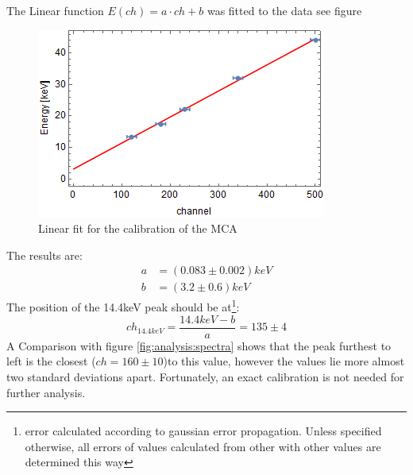The Linear function $E(ch)=a\cdot ch+b$ was fitted to the data see figure
\begin{figure}[H]
\centering
\includegraphics[width=0.7\linewidth]{../results/calibration/fit}
\caption[MCA calibration]{Linear fit for the calibration of the MCA}
\label{fig:calibrationfit}
\end{figure}
The results are:
\begin{equation}
\begin{aligned}
	a &= (0.083\pm0.002)keV\\
	b &= (3.2 \pm 0.6)keV
\end{aligned}
\end{equation}
The position of the 14.4keV peak should be at\footnote{error calculated according to gaussian error propagation. Unless specified otherwise, all errors of values calculated from other with other values are determined this way}:
\begin{equation}
ch_{14.4keV}=\frac{14.4keV-b}{a}=135\pm4
\end{equation}
 A Comparison with figure \ref{fig:analysis:spectra} shows that the peak furthest to left is the closest ($ch=160\pm10$)to this value, however the values lie more almost two standard deviations apart. Fortunately, an exact calibration is not needed for further analysis.
